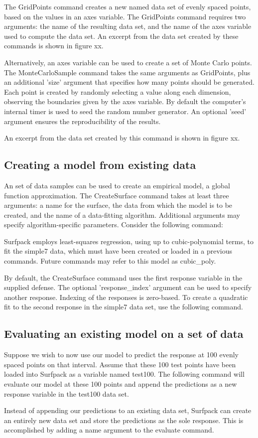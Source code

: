 \documentclass{article}
\begin{document}
The GridPoints command creates a new named data set of evenly spaced points, based on the values in an axes variable.  The GridPoints command requires two arguments: the name of the resulting data set, and the name of the axes variable used to compute the data set.
An excerpt from the data set created by these commands is shown in figure xx.


Alternatively, an axes variable can be used to create a set of Monte Carlo points.  The MonteCarloSample command takes the same arguments as GridPoints, plus an additional 'size' argument that specifies how many points should be generated.  Each point is created by randomly selecting a value along each dimension, observing the boundaries given by the axes variable.  By default the computer's internal timer is used to seed the random number generator. An optional 'seed' argument ensures the reproducibility of the results.

An excerpt from the data set created by this command is shown in figure xx.


\subsection{Creating a model from existing data}\label{sec:create_surface}
An set of data samples can be used to create an empirical model, a global function approximation.  The CreateSurface command takes at least three arguments: a name for the surface, the data from which the model is to be created, and the name of a data-fitting algorithm.  Additional arguments may specify algorithm-specific parameters.  Consider the following command:

Surfpack employs least-squares regression, using up to cubic-polynomial terms, to fit the simple7 data, which must have been created or loaded in a previous commands.  Future commands may refer to this model as cubic\_poly.

By default, the CreateSurface command uses the first response variable in the supplied defense.  The optional 'response\_index' argument can be used to specify another response.  Indexing of the responses is zero-based.  To create a quadratic fit to the second response in the simple7 data set, use the following command.

\subsection{Evaluating an existing model on a set of data}\label{sec:evaluate}
Suppose we wish to now use our model to predict the response at 100 evenly spaced points on that interval.  Assume that these 100 test points have been loaded into Surfpack as a variable named test100.  The following command will evaluate our model at these 100 points and append the predictions as a new response variable in the test100 data set.  

Instead of appending our predictions to an existing data set, Surfpack can create an entirely new data set and store the predictions as the sole response.  This is accomplished by adding a name argument to the evaluate command.

\end{document}
